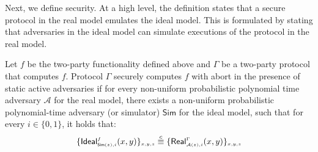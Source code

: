  
 Next, we define security. At a high level, the definition states that a secure protocol in the real model emulates the ideal model. This is formulated by stating that adversaries in the ideal model can simulate executions of the protocol in the real model. 
 
\begin{definition}\label{def::MPC-active-adv}
Let $f$ be the two-party functionality defined above and $\Gamma$ be a two-party protocol that computes $f$.   Protocol $\Gamma$ securely computes $f$ with abort in the presence of static active adversaries if for every non-uniform probabilistic polynomial time adversary $\mathcal{A}$ for the real model, there exists a non-uniform probabilistic polynomial-time adversary (or simulator) $\mathsf{Sim}$ for the ideal model, such that for every $i\in \{0,1\}$, it holds that: 
%
\begin{equation*}
\{\mathsf {Ideal}^{\scriptscriptstyle f}_{\scriptscriptstyle \mathsf{Sim}(z), i}(x,y)\}_{\scriptscriptstyle x,y,z}\stackrel{c}{\equiv} \{\mathsf{Real}_{\scriptscriptstyle \mathcal{A}(z), i}^{\scriptscriptstyle \Gamma}(x,y) \}_{\scriptscriptstyle x,y,z}
\end{equation*}
%
\end{definition}
 
 
  
  